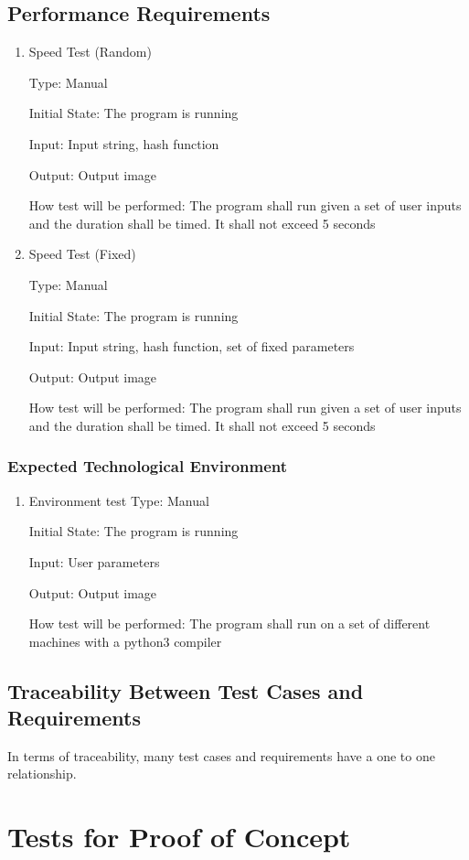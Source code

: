 \documentclass[12pt, titlepage]{article}
\begin{document}
\subsection{Performance Requirements}
\begin{enumerate}
    \item {Speed Test (Random)}

    Type: Manual

Initial State: The program is running

Input: Input string, hash function

Output: Output image

How test will be performed: The program shall run given a set of user inputs and the duration shall be timed. It shall not exceed 5 seconds
    \item {Speed Test (Fixed)}

    Type: Manual

Initial State: The program is running

Input: Input string, hash function, set of fixed parameters

Output: Output image

How test will be performed: The program shall run given a set of user inputs and the duration shall be timed. It shall not exceed 5 seconds
\end{enumerate}
\subsubsection{Expected Technological Environment}
\begin{enumerate}
    \item {Environment test}
    Type: Manual

Initial State: The program is running

Input: User parameters

Output: Output image

How test will be performed: The program shall run on a set of different machines with a python3 compiler
\end{enumerate}

\subsection{Traceability Between Test Cases and Requirements}

In terms of traceability, many test cases and requirements have a one to one relationship.

\section{Tests for Proof of Concept}
\end{document}
